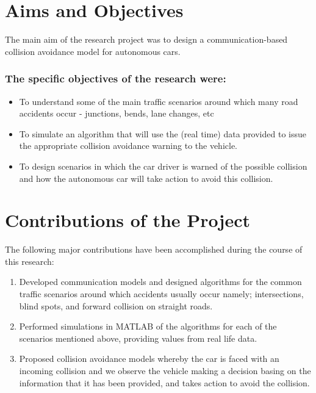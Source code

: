 \documentclass[12pt]{report}
\begin{document}
\section{Aims and Objectives}

The main aim of the research project was to design a communication-based collision avoidance model for
autonomous cars.

\subsubsection{The specific objectives of the research were:}

\begin{itemize}[topsep=0pt]

\item To understand some of the main traffic scenarios around which many road accidents occur - junctions, bends, lane changes, etc
\item To simulate an algorithm that will use the (real time) data provided to issue the appropriate collision avoidance warning to the vehicle.
\item To design scenarios in which the car driver is warned of the possible collision and how the autonomous car will take action to avoid this
collision. 

\end{itemize}


\section{Contributions of the Project}

The following major contributions have been accomplished during the course of this research:

\begin{enumerate}[topsep=0pt]

\item Developed communication models and designed algorithms for the common traffic scenarios around which accidents usually occur namely; intersections, blind spots, and forward collision on straight roads. 

\item Performed simulations in MATLAB of the algorithms for each of the scenarios mentioned above, providing values from real life data.

\item Proposed collision avoidance models whereby the car is faced with an incoming collision and we observe the vehicle making a decision  basing on the information that it has been provided, and takes action to avoid the collision.

\end{enumerate}
\end{document}
